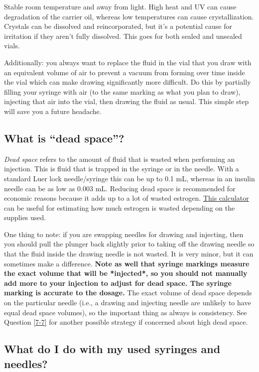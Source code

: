 \documentclass{article}
\begin{document}
Stable room temperature and away from light. High heat and UV can cause degradation of the carrier oil, whereas low temperatures can cause crystallization. Crystals can be dissolved and reincorporated, but it’s a potential cause for irritation if they aren’t fully dissolved. This goes for both sealed and unsealed vials.

Additionally: you always want to replace the fluid in the vial that you draw with an equivalent volume of air to prevent a vacuum from forming over time inside the vial which can make drawing significantly more difficult. Do this by partially filling your syringe with air (to the same marking as what you plan to draw), injecting that air into the vial, then drawing the fluid as usual. This simple step will save you a future headache.

\subsection{What is “dead space”?}\label{5-26}

\textit{Dead space} refers to the amount of fluid that is wasted when performing an injection. This is fluid that is trapped in the syringe or in the needle. With a standard Luer lock needle/syringe this can be up to 0.1 mL, whereas in an insulin needle can be as low as 0.003 mL. Reducing dead space is recommended for economic reasons because it adds up to a lot of wasted estrogen. \href{https://web.archive.org/web/20260307075103/https://hrtcafe.net/Calc/}{This calculator} can be useful for estimating how much estrogen is wasted depending on the supplies used.

One thing to note: if you are swapping needles for drawing and injecting, then you should pull the plunger back slightly prior to taking off the drawing needle so that the fluid inside the drawing needle is not wasted. It is very minor, but it can sometimes make a difference. \textbf{Note as well that syringe markings measure the exact volume that will be *injected*, so you should not manually add more to your injection to adjust for dead space. The syringe marking is accurate to the dosage.} The exact volume of dead space depends on the particular needle (i.e., a drawing and injecting needle are unlikely to have equal dead space volumes), so the important thing as always is consistency. See Question \ref{7-7} for another possible strategy if concerned about high dead space.

\subsection{What do I do with my used syringes and needles?}\label{5-27}
\end{document}
